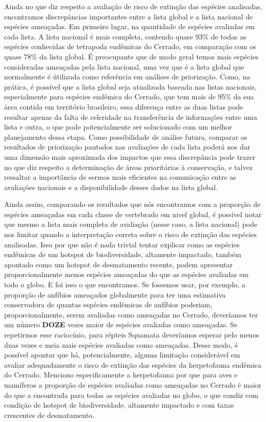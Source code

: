 \documentclass[12pt,openright,oneside,a4paper,english]{abntex2}
\begin{document}
Ainda no que diz respeito a avaliação de risco de extinção das espécies analisadas, encontramos discrepâncias importantes entre a lista global e a lista nacional de espécies ameaçadas. Em primeiro lugar, na quantidade de espécies avaliadas em cada lista. A lista nacional é mais completa, contendo quase 93\% de todas as espécies conhecidas de tetrapoda endêmicas do Cerrado, em comparação com os quase 78\% da lista global. É preocupante que de modo geral temos mais espécies consideradas ameaçadas pela lista nacional, uma vez que é a lista global que normalmente é útilizada como referência em análises de priorização. Como, na prática, é possível que a lista global seja atualizada baseada nas listas nacionais, especialmente para espécies endêmica do Cerrado, que tem mais de 95\% da sua área contida em território brasileiro, essa diferença entre as duas listas pode resultar apenas da falta de celeridade na transferência de informações entre uma lista e outra, o que pode potencialmente ser solucionado com um melhor planejamento dessa etapa. Como possibilidade de análise futura, comparar os resultados de priorização pautados nas avaliações de cada lista poderá nos dar uma dimensão mais aproximada dos impactos que essa discrepância pode trazer no que diz respeito a determinação de áreas prioritárias à conservação, e talvez ressaltar a importância de sermos mais eficientes na comunicação entre as avaliações nacionais e a disponibilidade desses dados na lista global.

Ainda assim, comparando os resultados que nós encontramos com a proporção de espécies ameaçadas em cada classe de vertebrado em nivel global, é possível notar que mesmo a lista mais completa de avaliação (nesse caso, a lista nacional) pode nos limitar quando a interpretação correta sobre o risco de extinção das espécies analisadas. Isso por que não é nada trivial tentar explicar como as espécies endêmicas de um hotspot de biodiversidade, altamente impactado, também apontado como um hotspot de desmatamento recente, podem apresentar proporcionalmente menos espécies ameaçadas do que as espécies avaliadas em todo o globo. E foi isso o que encontramos. Se fossemos usar, por exemplo, a proporção de anfíbios ameaçados globalmente para ter uma estimativa conservadora de quantas espécies endêmicas de anfíbios poderiam, proporcionalmente, serem avaliadas como ameaçadas no Cerrado, deveríamos ter um número \textbf{DOZE} vezes maior de espécies avaliadas como ameaçadas. Se repetirmos esse raciocínio, para répteis Squamata deveríamos esperar pelo menos duas vezes e meia mais espécies avaliadas como ameaçadas. Desse modo, é possível apontar que há, potencialmente, alguma limitação considerável em avaliar adequadamente o risco de extinção das espécies da herpetofauna endêmica do Cerrado. Menciono especificamente a herpetofauna por que para aves e mamíferos a proporção de espécies avaliadas como ameaçadas no Cerrado é maior do que a encontrada para todas as espécies avaliadas no globo, o que condiz com condição de hotspot de biodiversidade, altamente impactado e com taxas crescentes de desmatamento.
\end{document}

